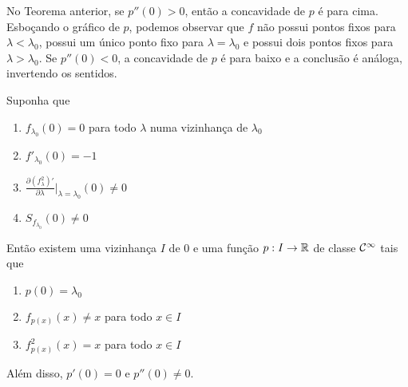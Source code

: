 No Teorema anterior, se $p''(0) > 0$, então a concavidade de $p$ é para cima. Esboçando o gráfico de $p$, podemos observar que $f$ não possui pontos fixos para $\lambda < \lambda_0$, possui um único ponto fixo para $\lambda = \lambda_0$ e possui dois pontos fixos para $\lambda > \lambda_0$. Se $p''(0) < 0$, a concavidade de $p$ é para baixo e a conclusão é análoga, invertendo os sentidos.

\begin{theorem}
Suponha que
\begin{enumerate}
\item $f_{\lambda_0}(0) = 0$ para todo $\lambda$ numa vizinhança de $\lambda_0$
\item $f'_{\lambda_0}(0) = -1$
\item $\frac{\partial (f^2_\lambda)'}{\partial \lambda} |_{\lambda = \lambda_0}(0) \neq 0$
\item $S_{f_{\lambda_0}}(0) \neq 0$
\end{enumerate}
Então existem uma vizinhança $I$ de $0$ e uma função $p: I \to \mathbb{R}$ de classe $\mathcal{C}^\infty$ tais que 
\begin{enumerate}
\item $p(0) = \lambda_0$
\item $f_{p(x)}(x) \neq x$ para todo $x \in I$
\item $f^2_{p(x)}(x) = x$ para todo $x \in I$
\end{enumerate}
Além disso, $p'(0) = 0$ e $p''(0) \neq 0$.
\end{theorem}

